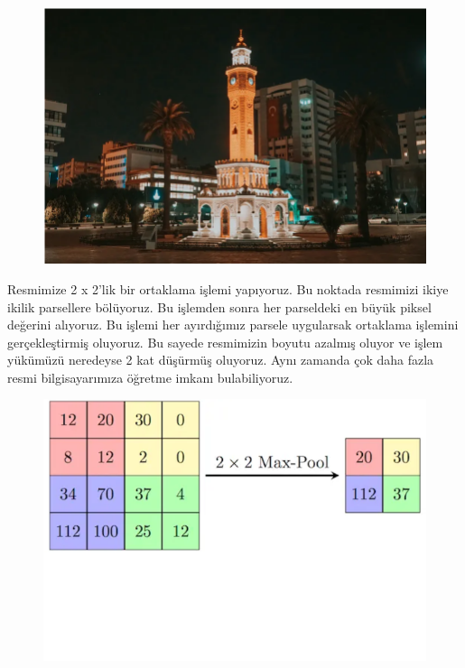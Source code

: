 \documentclass[12pt,a4paper]{article}
\begin{document}
\begin{enumerate}
\begin{center}
\begin{enumerate}
			\begin{figure}
				\centering
				\includegraphics{convex3.png}
			\end{figure}
			\pagebreak
			Resmimize 2 x 2'lik bir ortaklama işlemi yapıyoruz. Bu noktada resmimizi ikiye ikilik parsellere bölüyoruz. Bu işlemden sonra her parseldeki en büyük piksel değerini alıyoruz. Bu işlemi her ayırdığımız parsele uygularsak ortaklama işlemini gerçekleştirmiş oluyoruz. Bu sayede resmimizin boyutu azalmış oluyor ve işlem yükümüzü neredeyse 2 kat düşürmüş oluyoruz. Aynı zamanda çok daha fazla resmi bilgisayarımıza öğretme imkanı bulabiliyoruz.
			\begin{figure}
				\centering
				\includegraphics{maxpool.png}
			\end{figure}
			
		\end{enumerate}
		

\end{center}
\end{enumerate}
\end{document}
